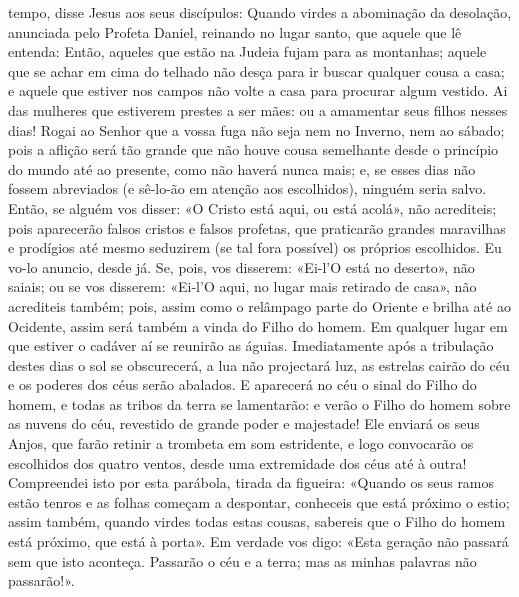\begin{paracol}{2}
{ tempo, disse Jesus aos seus discípulos: Quando virdes a abominação da desolação, anunciada pelo Profeta Daniel, reinando no lugar santo, que aquele que lê entenda: Então, aqueles que estão na Judeia fujam para as montanhas; aquele que se achar em cima do telhado não desça para ir buscar qualquer cousa a casa; e aquele que estiver nos campos não volte a casa para procurar algum vestido. Ai das mulheres que estiverem prestes a ser mães: ou a amamentar seus filhos nesses dias! Rogai ao Senhor que a vossa fuga não seja nem no Inverno, nem ao sábado; pois a aflição será tão grande que não houve cousa semelhante desde o princípio do mundo até ao presente, como não haverá nunca mais; e, se esses dias não fossem abreviados (e sê-lo-ão em atenção aos escolhidos), ninguém seria salvo. Então, se alguém vos disser: «O Cristo está aqui, ou está acolá», não acrediteis; pois aparecerão falsos cristos e falsos profetas, que praticarão grandes maravilhas e prodígios até mesmo seduzirem (se tal fora possível) os próprios escolhidos. Eu vo-lo anuncio, desde já. Se, pois, vos disserem: «Ei-l’O está no deserto», não saiais; ou se vos disserem: «Ei-l’O aqui, no lugar mais retirado de casa», não acrediteis também; pois, assim como o relâmpago parte do Oriente e brilha até ao Ocidente, assim será também a vinda do Filho do homem. Em qualquer lugar em que estiver o cadáver aí se reunirão as águias. Imediatamente após a tribulação destes dias o sol se obscurecerá, a lua não projectará luz, as estrelas cairão do céu e os poderes dos céus serão abalados. E aparecerá no céu o sinal do Filho do homem, e todas as tribos da terra se lamentarão: e verão o Filho do homem sobre as nuvens do céu, revestido de grande poder e majestade! Ele enviará os seus Anjos, que farão retinir a trombeta em som estridente, e logo convocarão os escolhidos dos quatro ventos, desde uma extremidade dos céus até à outra! Compreendei isto por esta parábola, tirada da figueira: «Quando os seus ramos estão tenros e as folhas começam a despontar, conheceis que está próximo o estio; assim também, quando virdes todas estas cousas, sabereis que o Filho do homem está próximo, que está à porta». Em verdade vos digo: «Esta geração não passará sem que isto aconteça. Passarão o céu e a terra; mas as minhas palavras não passarão!».
}\end{paracol}

\begin{paracol}{2}\switchcolumn{}\end{paracol}

